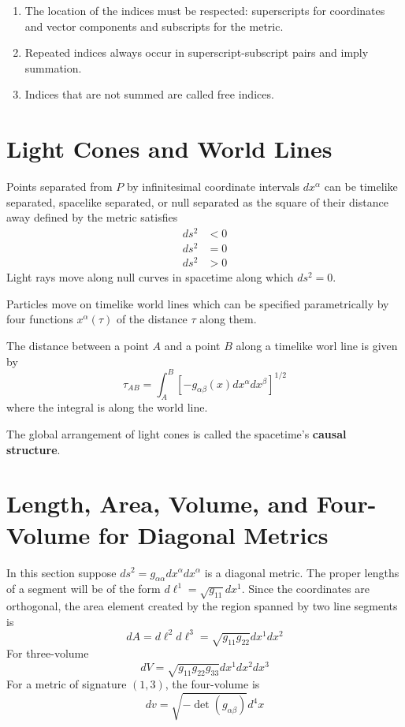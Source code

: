 \begin{enumerate}
    \item The location of the indices must be respected: superscripts for coordinates and vector components and subscripts for the metric.
    \item Repeated indices always occur in superscript-subscript pairs and imply summation.
    \item Indices that are not summed are called free indices.
\end{enumerate}



\section{Light Cones and World Lines}
\label{sec:LightWorld}

Points separated from $P$ by infinitesimal coordinate intervals $dx^{\alpha}$ can be timelike separated, spacelike separated, or null separated as the square of their distance away defined by the metric satisfies \begin{align*}
    ds^2 &< 0 \tag{timelike separation} \\
    ds^2 &= 0 \tag{null separation} \\
    ds^2 &> 0 \tag{spacelike separation}
\end{align*}
Light rays move along null curves in spacetime along which $ds^2= 0$.

Particles move on timelike world lines which can be specified parametrically by four functions $x^{\alpha}(\tau)$ of the distance $\tau$ along them.
\begin{defn}
    The distance between a point $A$ and a point $B$ along a timelike worl line is given by \begin{equation*}
        \tau_{AB} = \int_A^B[-g_{\alpha\beta}(x)dx^{\alpha}dx^{\beta}]^{1/2}
    \end{equation*}
    where the integral is along the world line.
\end{defn}

The global arrangement of light cones is called the spacetime's \textbf{causal structure}.


\section{Length, Area, Volume, and Four-Volume for Diagonal Metrics}
\label{sec:measurements}

In this section suppose $ds^2 = g_{\alpha\alpha}dx^{\alpha}dx^{\alpha}$ is a diagonal metric. The proper lengths of a segment will be of the form $d\ell^{1} = \sqrt{g_{11}}dx^{1}$. Since the coordinates are orthogonal, the area element created by the region spanned by two line segments is $$dA = d\ell^2d\ell^3 = \sqrt{g_{11}g_{22}}dx^1dx^2$$
For three-volume $$dV = \sqrt{g_{11}g_{22}g_{33}}dx^1dx^2dx^3$$
For a metric of signature $(1,3)$, the four-volume is $$dv = \sqrt{-\det(g_{\alpha\beta})}d^4x$$







